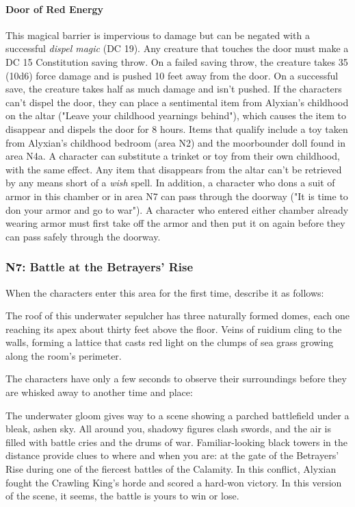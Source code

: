 \documentclass[10pt,a4,twoside,twocolumn,openany,nodeprecatedcode]{dndbook}
\begin{document}
\paragraph{Door of Red Energy}
This magical barrier is impervious to damage but can be negated with a successful \textit{dispel magic} (DC 19). Any creature that touches the door must make a DC 15 Constitution saving throw. On a failed saving throw, the creature takes 35 (10d6) force damage and is pushed 10 feet away from the door. On a successful save, the creature takes half as much damage and isn't pushed.
If the characters can't dispel the door, they can place a sentimental item from Alyxian's childhood on the altar ("Leave your childhood yearnings behind"), which causes the item to disappear and dispels the door for 8 hours. Items that qualify include a toy taken from Alyxian's childhood bedroom (area N2) and the moorbounder doll found in area N4a. A character can substitute a trinket or toy from their own childhood, with the same effect. Any item that disappears from the altar can't be retrieved by any means short of a \textit{wish} spell.
In addition, a character who dons a suit of armor in this chamber or in area N7 can pass through the doorway ("It is time to don your armor and go to war"). A character who entered either chamber already wearing armor must first take off the armor and then put it on again before they can pass safely through the doorway.
\subsubsection{N7: Battle at the Betrayers' Rise}
When the characters enter this area for the first time, describe it as follows:
\begin{DndReadAloud}{}
The roof of this underwater sepulcher has three naturally formed domes, each one reaching its apex about thirty feet above the floor. Veins of ruidium cling to the walls, forming a lattice that casts red light on the clumps of sea grass growing along the room's perimeter.
\end{DndReadAloud}

The characters have only a few seconds to observe their surroundings before they are whisked away to another time and place:
\begin{DndReadAloud}{}
The underwater gloom gives way to a scene showing a parched battlefield under a bleak, ashen sky. All around you, shadowy figures clash swords, and the air is filled with battle cries and the drums of war.
Familiar-looking black towers in the distance provide clues to where and when you are: at the gate of the Betrayers' Rise during one of the fiercest battles of the Calamity. In this conflict, Alyxian fought the Crawling King's horde and scored a hard-won victory. In this version of the scene, it seems, the battle is yours to win or lose.
\end{DndReadAloud}
\end{document}
